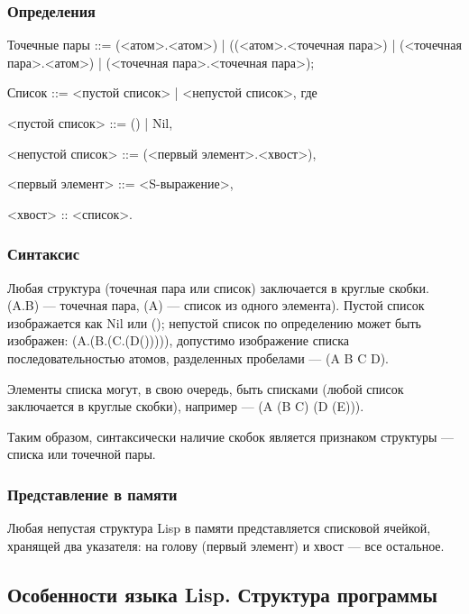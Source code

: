 \documentclass[a4paper,oneside,14pt]{extarticle}
\begin{document}
\subsubsection{Определения}

Точечные пары ::= (<атом>.<атом>) | ((<атом>.<точечная пара>) | (<точечная пара>.<атом>) | (<точечная пара>.<точечная пара>);

Список ::= <пустой список> | <непустой список>, где

<пустой список> ::= () | Nil,

<непустой список> ::= (<первый элемент>.<хвост>),

<первый элемент> ::= <S-выражение>,

<хвост> :: <список>.

\subsubsection{Синтаксис}

Любая структура (точечная пара или список) заключается в круглые скобки.
(A.B) --- точечная пара, (A) --- список из одного элемента).
Пустой список изображается как Nil или (); непустой список по определению может быть изображен: (A.(B.(C.(D())))), допустимо изображение списка последовательностью атомов, разделенных пробелами --- (A B C D).

Элементы списка могут, в свою очередь, быть списками (любой список заключается в круглые скобки), например --- (A (B C) (D (E))).

Таким образом, синтаксически наличие скобок является признаком структуры --- списка или точечной пары.

\subsubsection{Представление в памяти}

Любая непустая структура Lisp в памяти представляется списковой ячейкой, хранящей два указателя: на голову (первый элемент) и хвост --- все остальное.

\subsection{Особенности языка Lisp. Структура программы}
\end{document}

